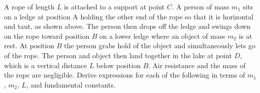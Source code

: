 \documentclass{../../oss-classkick-exam}
\begin{document}
\begin{questions}
  \newpage

  \question A rope of length $L$ is attached to a support at point $C$. A person
  of mass $m_1$ sits on a ledge at position A holding the other end of the rope
  so that it is horizontal and taut, as shown above. The person then drops off
  the ledge and swings down on the rope toward position $B$ on a lower ledge
  where an object of mass $m_2$ is at rest. At position $B$ the person grabs
  hold of the object and simultaneously lets go of the rope. The person and
  object then land together in the lake at point $D$, which is a vertical
  distance $L$ below position $B$. Air resistance and the mass of the rope are
  negligible. Derive expressions for each of the following in terms of
  $m_1$, $m_2$, $L$, and fundamental constants.
\end{questions}
\end{document}
